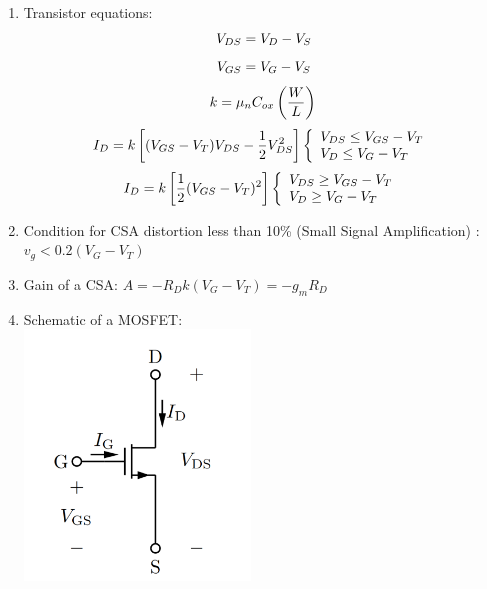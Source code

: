 \documentclass[twocolumn]{article}
\begin{document}
\begin{enumerate}
    \item Transistor equations: 
    \begin{equation*}
        V_{DS} = V_D -V_S\\
    \end{equation*}
    \begin{equation*}
        V_{GS} = V_G - V_S \\
    \end{equation*}
    \begin{equation*}
         k = \mu_n C_{ox} \left(\frac{W}{L}\right)\\
    \end{equation*}
    \begin{equation*}
        I_D = k\left[(V_{GS} - V_T)V_{DS} - \frac{1}{2} V_{DS}^2\right]
        \left\{
            \begin{array}{l}
                V_{DS} \leq V_{GS} - V_T \\
                V_D \leq V_G - V_T \\
            \end{array}
        \right.\\ 
    \end{equation*}
    \begin{equation*}
         I_D = k \left[\frac{1}{2} (V_{GS}-V_T)^2\right]
        \left\{
            \begin{array}{l}
                V_{DS} \geq V_{GS} - V_T \\
                V_D \geq V_G - V_T \\
            \end{array}
        \right.\\ 
    \end{equation*}  
    \item Condition for CSA distortion less than 10\% (Small Signal Amplification) : $v_{g\hat{}} < 0.2(V_G-V_T)$
    \item Gain of a CSA: $A = -R_Dk(V_G-V_T)=-g_m R_D$
    \item Schematic of a MOSFET: \\
    \includegraphics[width=6cm]{images/mosfet.png}
\end{enumerate}
\end{document}
